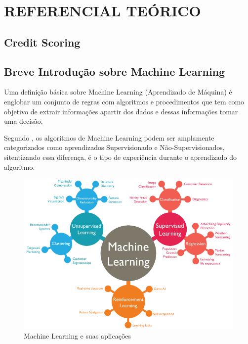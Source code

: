 \documentclass[
	12pt,				%
	openright,			%
	oneside,      %
	a4paper,			%
	english,			%
	french,				%
	spanish,			%
	brazil,				%
	]{abntex2}\usepackage[]{graphicx}\usepackage[]{xcolor}
\begin{document}
\chapter{REFERENCIAL TEÓRICO}


  \section{Credit Scoring}
  
  
  
  
  \section{Breve Introdução sobre Machine Learning}
  
Uma definição básica sobre Machine Learning (Aprendizado de Máquina) é englobar 
um conjunto de regras com algoritmos e procedimentos que tem como objetivo de 
extrair informações apartir dos dados e dessas informações tomar uma decisão.

Segundo \cite{goodfellow2016deep}, os algoritmos de Machine Learning podem ser 
amplamente categorizados como aprendizados Supervisionado e Não-Supervisionados, 
sitentizando essa diferença, é o tipo de experiência durante o aprendizado do 
algoritmo.

  
    \begin{figure}
      \caption{\label{img1}Machine Learning e suas aplicações}
      \begin{center}
        \includegraphics[scale = 0.4]{image/img1.png}
      \end{center}
    \end{figure}
  
\end{document}
